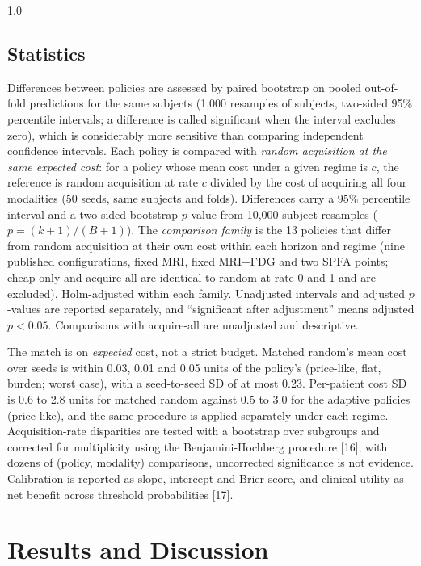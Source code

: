 \documentclass[12pt,twoside]{article}
\begin{document}
\begin{spacing}{1.0}
\subsection{Statistics}
Differences between policies are assessed by paired bootstrap on pooled
out-of-fold predictions for the same subjects (1,000 resamples of subjects,
two-sided 95\% percentile intervals; a difference is called significant when
the interval excludes zero), which is considerably more sensitive than
comparing independent confidence intervals. Each policy is compared with \emph{random acquisition at the same expected cost}: for a policy whose mean
cost under a given regime is $c$, the reference is random acquisition at rate $c$ divided by the cost of
acquiring all four modalities (50 seeds, same subjects and folds). Differences carry a 95\% percentile
interval and a two-sided bootstrap $p$-value from 10,000 subject resamples ($p=(k+1)/(B+1)$). The
\emph{comparison family} is the 13 policies that differ from random acquisition at their own cost within each
horizon and regime (nine published configurations, fixed MRI, fixed MRI+FDG and two SPFA points; cheap-only
and acquire-all are identical to random at rate 0 and 1 and are excluded), Holm-adjusted within each family.
Unadjusted intervals and adjusted $p$-values are reported separately, and ``significant after adjustment''
means adjusted $p<0.05$. Comparisons with acquire-all are unadjusted and descriptive.

The match is on \emph{expected} cost, not a strict budget. Matched random's mean cost over seeds is within
0.03, 0.01 and 0.05 units of the policy's (price-like, flat, burden; worst case), with a seed-to-seed SD of at
most 0.23. Per-patient cost SD is 0.6 to 2.8 units for matched random against 0.5 to 3.0 for the adaptive
policies (price-like), and the same procedure is applied separately under each regime. Acquisition-rate
disparities are tested with a bootstrap over subgroups and corrected for
multiplicity using the Benjamini-Hochberg procedure [16]; with dozens of
(policy, modality) comparisons, uncorrected significance is not evidence.
Calibration is reported as slope, intercept and Brier score, and clinical
utility as net benefit across threshold probabilities [17].

\section{Results and Discussion}


\end{spacing}
\end{document}
